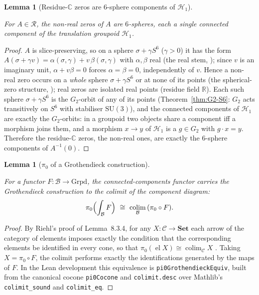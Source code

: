 \documentclass[11pt]{article}
\newcommand{\CC}{\mathbb{C}}
\newcommand{\RR}{\mathbb{R}}
\providecommand{\Gtwo}{G_2}
\providecommand{\Grpd}{\mathrm{Grpd}}
\providecommand{\lean}[1]{}
\providecommand{\uses}[1]{}
\theoremstyle{plain}
\newtheorem{lemma}[theorem]{Lemma}
\theoremstyle{definition}
\theoremstyle{remark}
\begin{document}
\begin{lemma}[Residue-$\CC$ zeros are $6$-sphere components of $\mathcal H_1$]\label{lem:residue-spheres}
\lean{ASection.sphereZero_mem_CResidueZeroLocus,
ASection.mem_CResidueZeroLocus_iff_exists_sphereZero,
G2.exists_smul_eq_of_mem_unitImaginarySphere}
\uses{def:two-worlds, thm:G2-S6, thm:wang}
For $A\in\mathcal R$, the non-real zeros of $A$ are $6$-spheres, each a single connected
component of the translation groupoid $\mathcal H_1$.
\end{lemma}
\begin{proof}
$A$ is slice-preserving, so on a sphere $\sigma+\gamma S^6$ \textup{(}$\gamma>0$\textup{)} it has
the form $A(\sigma+\gamma v)=\alpha(\sigma,\gamma)+v\,\beta(\sigma,\gamma)$ with $\alpha,\beta$
real (the real stem, \cite{Wang}); since $v$ is an imaginary unit, $\alpha+v\beta=0$ forces
$\alpha=\beta=0$, independently of $v$. Hence a non-real zero occurs on a \emph{whole} sphere
$\sigma+\gamma S^6$ or at none of its points (the spherical-zero structure, \cite{AdF}); real
zeros are isolated real points (residue field $\RR$). Each such sphere $\sigma+\gamma S^6$ is the
$\Gtwo$-orbit of any of its points (Theorem~\ref{thm:G2-S6}: $\Gtwo$ acts transitively on $S^6$
with stabiliser $\mathrm{SU}(3)$), and the connected components of $\mathcal H_1$ are exactly the
$\Gtwo$-orbits: in a groupoid two objects share a component iff a morphism joins them, and a
morphism $x\to y$ of $\mathcal H_1$ is a $g\in\Gtwo$ with $g\cdot x=y$. Therefore the
residue-$\CC$ zeros, the non-real ones, are exactly the $6$-sphere components of
$A^{-1}(0)$.
\end{proof}

\begin{lemma}[$\pi_0$ of a Grothendieck construction]\label{lem:pi0-grothendieck}
\lean{CategoryTheory.Grothendieck, pi0GrothendieckEquiv, pi0_grothendieck}
\uses{def:base}
For a functor $F:\mathcal B\to\Grpd$, the connected-components functor carries the Grothendieck
construction to the colimit of the component diagram:
\[
  \pi_0\Bigl(\int_{\mathcal B}F\Bigr)\ \cong\ \operatorname*{colim}_{\mathcal B}\,(\pi_0\circ F).
\]
\end{lemma}
\begin{proof}
By Riehl's proof of Lemma~8.3.4, for any $X:\mathcal C\to\mathbf{Set}$ each arrow of the
category of elements imposes exactly the condition that the corresponding elements be identified
in every cone, so that $\pi_0(\operatorname{el}X)\cong\operatorname{colim}_{\mathcal C}X$
\cite[p.~102]{Riehl}. Taking $X=\pi_0\circ F$, the colimit performs exactly the identifications
generated by the maps of $F$. In the Lean development this equivalence is
\texttt{pi0GrothendieckEquiv}, built from the canonical cocone \texttt{pi0Cocone} and
\texttt{colimit.desc} over Mathlib's \texttt{colimit\_sound} and \texttt{colimit\_eq}.
\end{proof}
\end{document}
